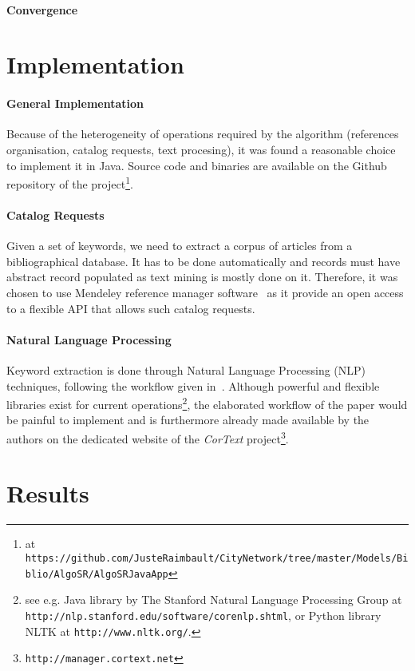 \paragraph{Convergence}





\section{Implementation}

\paragraph{General Implementation}
Because of the heterogeneity of operations required by the algorithm (references organisation, catalog requests, text procesing), it was found a reasonable choice to implement it in Java. Source code and binaries are available on the Github repository of the project\footnote{at \texttt{https://github.com/JusteRaimbault/CityNetwork/tree/master/Models/Biblio/AlgoSR/AlgoSRJavaApp}}.


\paragraph{Catalog Requests}
Given a set of keywords, we need to extract a corpus of articles from a bibliographical database. It has to be done automatically and records must have abstract record populated as text mining is mostly done on it. Therefore, it was chosen to use Mendeley reference manager software~\cite{mendeley} as it provide an open access to a flexible API that allows such catalog requests.


\paragraph{Natural Language Processing}
Keyword extraction is done through Natural Language Processing (NLP) techniques, following the workflow given in~\cite{chavalarias2013phylomemetic}. Although powerful and flexible libraries exist for current operations\footnote{see e.g. Java library by The Stanford Natural Language Processing Group at \texttt{http://nlp.stanford.edu/software/corenlp.shtml}, or Python library NLTK at \texttt{http://www.nltk.org/}.}, the elaborated workflow of the paper would be painful to implement and is furthermore already made available by the authors on the dedicated website of the \emph{CorText} project\footnote{\texttt{http://manager.cortext.net}}.

\section{Results}

















